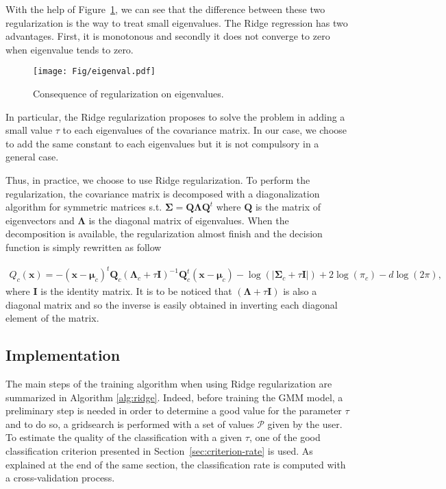 \documentclass[a4paper,11pt,DIV=16]{scrartcl}
\begin{document}
    With the help of Figure~\ref{fig:eigenvalues}, we can see that the difference between these two regularization is the way to treat small eigenvalues. The Ridge regression has two advantages. First, it is monotonous and secondly it does not converge to zero when eigenvalue tends to zero.

    \begin{figure}[!ht]
        \centering
        \texttt{[image: Fig/eigenval.pdf]}
        \caption{Consequence of regularization on eigenvalues.\label{fig:eigenvalues}}
    \end{figure}

    In particular, the Ridge regularization proposes to solve the problem in adding a small value $\tau$ to each eigenvalues of the covariance matrix. In our case, we choose to add the same constant to each eigenvalues but it is not compulsory in a general case.

    Thus, in practice, we choose to use Ridge regularization. To perform the regularization, the covariance matrix is decomposed with a diagonalization algorithm for symmetric matrices s.t. $\boldsymbol{\Sigma} = \mathbf{Q} \boldsymbol{\Lambda} \mathbf{Q}^t$ where $\mathbf{Q}$ is the matrix of eigenvectors and $\boldsymbol{\Lambda}$ is the diagonal matrix of eigenvalues. When the decomposition is available, the regularization almost finish and the decision function is simply rewritten as follow

    \begin{align}
    \label{eq:decision-ridge}
        Q_c(\mathbf{x}) = - (\mathbf{x} - \boldsymbol{\mu}_c)^t \mathbf{Q}_c (\boldsymbol{\Lambda}_c + \tau \mathbf{I})^{-1} \mathbf{Q}_c^t (\mathbf{x} - \boldsymbol{\mu}_c) - \log (|\boldsymbol{\Sigma}_c + \tau \mathbf{I}|) + 2 \log (\pi_c) - d \log (2\pi),
    \end{align}
    where $\mathbf{I}$ is the identity matrix. It is to be noticed that $(\boldsymbol{\Lambda} + \tau \mathbf{I})$ is also a diagonal matrix and so the inverse is easily obtained in inverting each diagonal element of the matrix.

    \subsection{Implementation}

    The main steps of the training algorithm when using Ridge regularization are summarized in Algorithm \ref{alg:ridge}. Indeed, before training the GMM model, a preliminary step is needed in order to determine a good value for the parameter $\tau$ and to do so, a gridsearch is performed with a set of values $\mathcal{P}$ given by the user. To estimate the quality of the classification with a given $\tau$, one of the good classification criterion presented in Section~\ref{sec:criterion-rate} is used. As explained at the end of the same section, the classification rate is computed with a cross-validation process.
\end{document}
